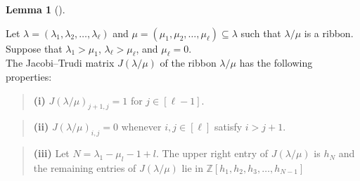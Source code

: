 \documentclass[numbers=enddot,12pt,final,onecolumn,notitlepage]{scrartcl}%
\theoremstyle{definition}
\newtheorem{lem}[theo]{Lemma}
\newenvironment{lemma}[1][]
{\begin{lem}[#1]\begin{leftbar}}
{\end{leftbar}\end{lem}}
\newtheorem{defi}[theo]{Definition}
\newenvironment{definition}[1][]
{\begin{defi}[#1]\begin{leftbar}}
{\end{leftbar}\end{defi}}
\newtheorem{exam}[theo]{Example}
\newenvironment{example}[1][]
{\begin{exam}[#1]\begin{leftbar}}
{\end{leftbar}\end{exam}}
\newenvironment{statement}{\begin{quote}}{\end{quote}}
\renewcommand{\leq}{\leqslant}
\theoremstyle{plainsl}
\begin{document}







\begin{lemma}
\label{lemma.Hessenberg}




















Let $\lambda= (\lambda_1, \lambda_2, \ldots, \lambda_{\ell})$  and $\mu= (\mu_1, \mu_2, \ldots, \mu_{\ell}) \subseteq \lambda$ such that $\lambda/\mu$ is a ribbon. 
Suppose that $\lambda_1> \mu_1$, $\lambda_\ell> \mu_\ell$, and $\mu_{\ell}=0$.\\
 
The Jacobi--Trudi matrix $J(\lambda/\mu)$ of the ribbon $\lambda/\mu$ has the following properties:

\begin{statement}
\textbf{(i)} $J(\lambda/\mu)_{j+1,j}=1$ for $j \in [\ell-1]$.
\end{statement}
 
\begin{statement}
\textbf{(ii)} $J(\lambda/\mu)_{i,j}=0$ whenever
$i, j \in [\ell]$ satisfy $i > j+1$.
\end{statement}

\begin{statement}
\textbf{(iii)} Let $N= \lambda_1 -\mu_l-1+l$. The upper right entry of $J(\lambda/\mu)$ is $h_N$ and the remaining entries of $J(\lambda/\mu)$ lie in $\mathbb{Z}\left[  h_{1},h_{2}%
,h_{3},\ldots, h_{N-1}\right]$
\end{statement}
\end{lemma}
\end{document}
